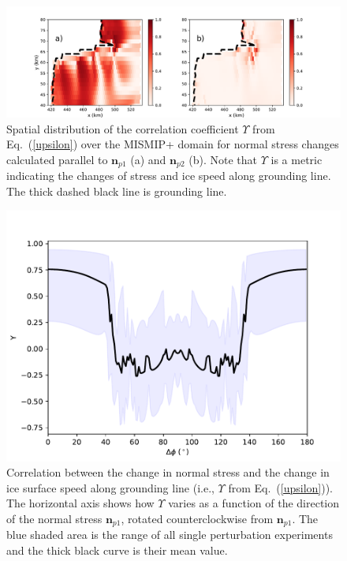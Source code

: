 \documentclass[tc, manuscript]{copernicus}
\begin{document}
\begin{figure}
	\centering
    \includegraphics[width=1\linewidth]{./figs/stressDiff_velDiff_GL_allPerturb.pdf}
    \caption{Spatial distribution of the correlation coefficient $\Upsilon$ from Eq.~(\ref{upsilon}) over the MISMIP+ domain for normal stress changes calculated parallel to $\mathbf{n}_{p1}$ (a) and $\mathbf{n}_{p2}$ (b). Note that $\Upsilon$ is a metric indicating the changes of stress and ice speed along grounding line. The thick dashed black line is grounding line.}
	\label{stressDiff_velDiff_GL_allPerturb}
\end{figure}

\begin{figure}
	\centering
    \includegraphics[width=0.8\linewidth]{./figs/stress_vel_corr_GL_allP.pdf}
    \caption{Correlation between the change in normal stress and the change in ice surface speed along grounding line (i.e., $\Upsilon$ from Eq.~(\ref{upsilon})). The horizontal axis shows how $\Upsilon$ varies as a function of the direction of the normal stress $\mathbf{n}_{p1}$, rotated counterclockwise from $\mathbf{n}_{p1}$. The blue shaded area is the range of all single perturbation experiments and the thick black curve is their mean value.}
	\label{stress_vel_corr_GL_allP}
\end{figure}
\end{document}
